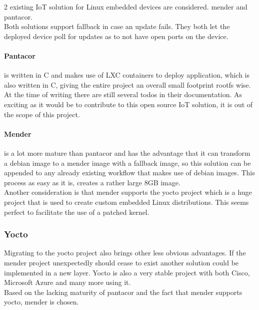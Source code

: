\documentclass[../../main.tex]{subfiles}
\begin{document}
2 existing IoT solution for Linux embedded devices are considered.
mender\cite{mender-home} and pantacor\cite{pantahub}.\\


Both solutions support fallback in case an update fails.
They both let the deployed device poll for updates as to not have open ports on the device.

\paragraph{Pantacor}%
\label{par:pantacor}

is written in C and makes use of LXC containers to deploy application, which is also written in C,
giving the entire project an overall small footprint rootfs wise.\\
At the time of writing there are still several todos in their documentation. As exciting as it
would be to contribute to this open source IoT solution, it is out of the scope of this project.


\paragraph{Mender}%
\label{par:mender}

is a lot more mature than pantacor and has the advantage that it can transform a debian image
to a mender image with a fallback image, so this solution can be appended to any already 
existing workflow that makes use of debian images. This process as easy as it is, creates a
rather large 8GB image.\\

Another consideration is that mender supports the yocto project which is a huge project that is
used to create custom embedded Linux distributions. This seems perfect to facilitate the use of
a patched kernel.\\

\subsubsection{Yocto}%
\label{ssub:yocto}

Migrating to the yocto project also brings other less obvious advantages.
If the mender project unexpectedly should cease to exist another solution could
be implemented in a new layer.
Yocto is also a very stable project with both Cisco, Microsoft Azure and many more using it.
\cite{yocto-members}
\\


Based on the lacking maturity of pantacor and the fact that mender supports yocto, mender is
chosen.
\end{document}
